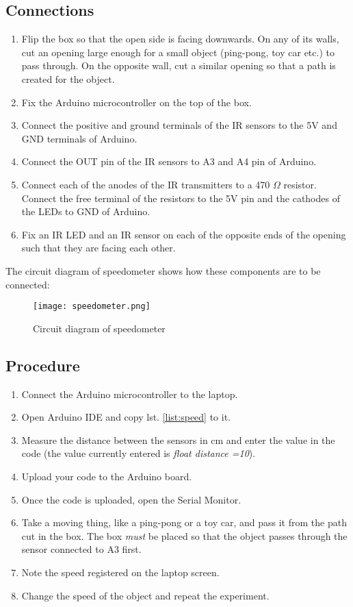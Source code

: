 \subsection*{Connections}
\begin{enumerate}[leftmargin=*]
    \item Flip the box so that the open side is facing downwards. On any of its walls, cut an opening large enough for a small object (ping-pong, toy car etc.) to pass through. On the opposite wall, cut a similar opening so that a path is created for the object.
    \item Fix the Arduino microcontroller on the top of the box. 
    \item Connect the positive and ground terminals of the IR sensors to the 5V and GND terminals of Arduino. 
    \item Connect the OUT pin of the IR sensors to A3 and A4 pin of Arduino. 
    \item Connect each of the anodes of the IR transmitters to a 470 $\Omega$ resistor. Connect the free terminal of the resistors to the 5V pin and the cathodes of the LEDs to GND of Arduino.
    \item Fix an IR LED and an IR sensor on each of the opposite ends of the opening such that they are facing each other.
\end{enumerate}
The circuit diagram of speedometer shows how these components are to be connected:
	\begin{figure}[H]
	\centering \texttt{[image: speedometer.png]}
	\caption{Circuit diagram of speedometer}
	\end{figure}

\subsection*{Procedure}
\begin{enumerate}[leftmargin=*]
    \item Connect the Arduino microcontroller to the laptop. 
    \item Open Arduino IDE and copy lst. \ref{list:speed} to it.
    \item Measure the distance between the sensors in cm and enter the value in the code (the value currently entered is \textit{float distance =10}). 
    \item Upload your code to the Arduino board.
    \item Once the code is uploaded, open the Serial Monitor.
    \item Take a moving thing, like a ping-pong or a toy car, and pass it from the path cut in the box. The box \textit{must} be placed so that the object passes through the sensor connected to A3 first.
    \item Note the speed registered on the laptop screen. 
    \item Change the speed of the object and repeat the experiment.
\end{enumerate}

